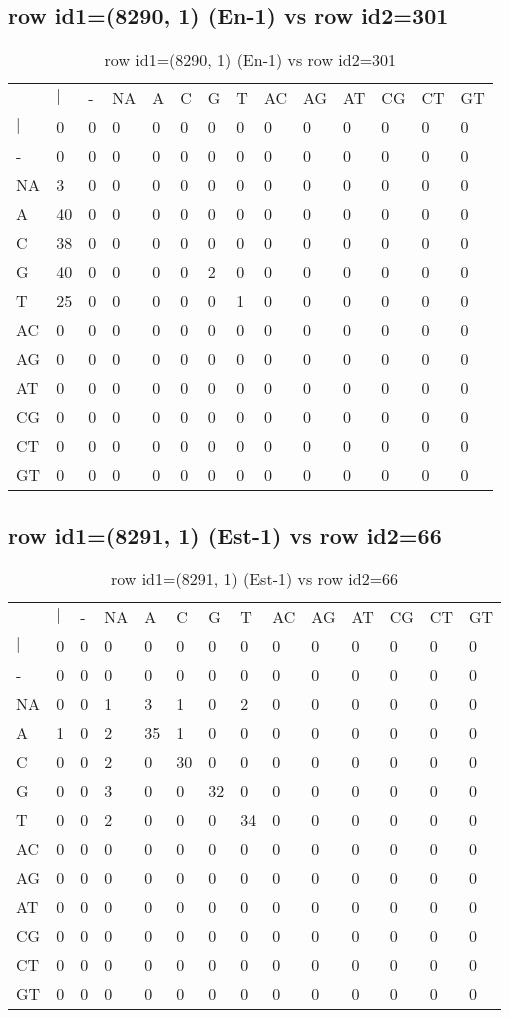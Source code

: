 \subsection{row id1=(8290, 1) (En-1) vs row id2=301}
\begin{center}
\begin{longtable}{|l|l|l|l|l|l|l|l|l|l|l|l|l|l|}
\caption{row id1=(8290, 1) (En-1) vs row id2=301} \label{table_dm454}\\
\hline
\\
\hline
&$|$&-&NA&A&C&G&T&AC&AG&AT&CG&CT&GT\\
$|$&0&0&0&0&0&0&0&0&0&0&0&0&0\\
-&0&0&0&0&0&0&0&0&0&0&0&0&0\\
NA&3&0&0&0&0&0&0&0&0&0&0&0&0\\
A&40&0&0&0&0&0&0&0&0&0&0&0&0\\
C&38&0&0&0&0&0&0&0&0&0&0&0&0\\
G&40&0&0&0&0&2&0&0&0&0&0&0&0\\
T&25&0&0&0&0&0&1&0&0&0&0&0&0\\
AC&0&0&0&0&0&0&0&0&0&0&0&0&0\\
AG&0&0&0&0&0&0&0&0&0&0&0&0&0\\
AT&0&0&0&0&0&0&0&0&0&0&0&0&0\\
CG&0&0&0&0&0&0&0&0&0&0&0&0&0\\
CT&0&0&0&0&0&0&0&0&0&0&0&0&0\\
GT&0&0&0&0&0&0&0&0&0&0&0&0&0\\
\hline
\end{longtable}
\end{center}

\subsection{row id1=(8291, 1) (Est-1) vs row id2=66}
\begin{center}
\begin{longtable}{|l|l|l|l|l|l|l|l|l|l|l|l|l|l|}
\caption{row id1=(8291, 1) (Est-1) vs row id2=66} \label{table_dm456}\\
\hline
\\
\hline
&$|$&-&NA&A&C&G&T&AC&AG&AT&CG&CT&GT\\
$|$&0&0&0&0&0&0&0&0&0&0&0&0&0\\
-&0&0&0&0&0&0&0&0&0&0&0&0&0\\
NA&0&0&1&3&1&0&2&0&0&0&0&0&0\\
A&1&0&2&35&1&0&0&0&0&0&0&0&0\\
C&0&0&2&0&30&0&0&0&0&0&0&0&0\\
G&0&0&3&0&0&32&0&0&0&0&0&0&0\\
T&0&0&2&0&0&0&34&0&0&0&0&0&0\\
AC&0&0&0&0&0&0&0&0&0&0&0&0&0\\
AG&0&0&0&0&0&0&0&0&0&0&0&0&0\\
AT&0&0&0&0&0&0&0&0&0&0&0&0&0\\
CG&0&0&0&0&0&0&0&0&0&0&0&0&0\\
CT&0&0&0&0&0&0&0&0&0&0&0&0&0\\
GT&0&0&0&0&0&0&0&0&0&0&0&0&0\\
\hline
\end{longtable}
\end{center}

